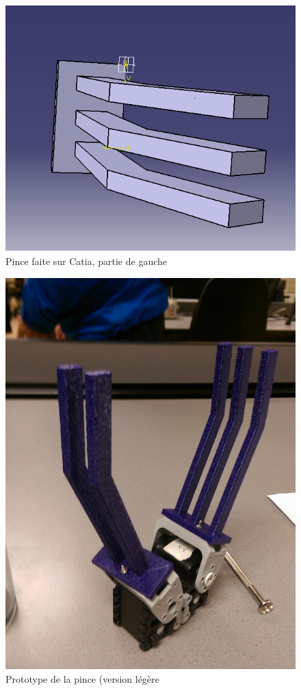 \begin{figure}[!ht]
    \centering
    \includegraphics[scale=0.5]{pince2.png}
    \caption{Pince faite sur Catia, partie de gauche}
\end{figure}

\begin{figure}[!ht]
    \centering
    \includegraphics[width=10 cm]{pince1.jpg}
    \caption{Prototype de la pince (version légère}
    \label{fig:Pince1}
\end{figure}

